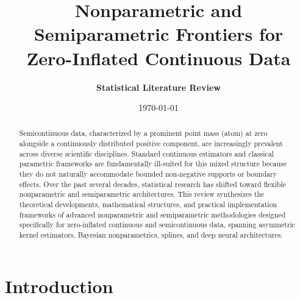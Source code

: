\usepackage[a4paper, top=2.5cm, bottom=2.5cm, left=2cm, right=2cm]{geometry}
\usepackage{fontspec}
\usepackage[english, bidi=basic, provide=*]{babel}


\usepackage{amsmath}
\usepackage{amssymb}
\usepackage{amsthm}
\usepackage{booktabs}
\usepackage{tabularx}
\usepackage{enumitem}
\usepackage{microtype}
\usepackage{pdflscape} %
\usepackage{hyperref}


\title{\textbf{Nonparametric and Semiparametric Frontiers for\\ Zero-Inflated Continuous Data}}
\author{\textbf{Statistical Literature Review}}
\date{\today}



\maketitle

\begin{abstract}
Semicontinuous data, characterized by a prominent point mass (atom) at zero alongside a continuously distributed positive component, are increasingly prevalent across diverse scientific disciplines. Standard continuous estimators and classical parametric frameworks are fundamentally ill-suited for this mixed structure because they do not naturally accommodate bounded non-negative supports or boundary effects. Over the past several decades, statistical research has shifted toward flexible nonparametric and semiparametric architectures. This review synthesizes the theoretical developments, mathematical structures, and practical implementation frameworks of advanced nonparametric and semiparametric methodologies designed specifically for zero-inflated continuous and semicontinuous data, spanning asymmetric kernel estimators, Bayesian nonparametrics, splines, and deep neural architectures.
\end{abstract}

\section{Introduction}

